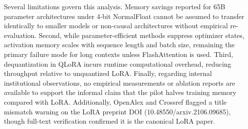\documentclass[11pt,a4paper]{article}
\begin{document}
Several limitations govern this analysis. Memory savings reported for 65B parameter architectures under 4-bit NormalFloat cannot be assumed to transfer identically to smaller models or non-causal architectures without empirical re-evaluation. Second, while parameter-efficient methods suppress optimizer states, activation memory scales with sequence length and batch size, remaining the primary failure mode for long contexts unless FlashAttention is used. Third, dequantization in QLoRA incurs runtime computational overhead, reducing throughput relative to unquantized LoRA. Finally, regarding internal institutional observations, no empirical measurements or ablation reports are available to support the informal claim that the pilot halves training memory compared with LoRA. Additionally, OpenAlex and Crossref flagged a title mismatch warning on the LoRA preprint DOI (10.48550/arxiv.2106.09685), though full-text verification confirmed it is the canonical LoRA paper.



\end{document}
